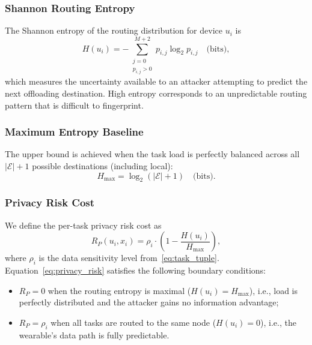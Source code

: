 \documentclass[journal,twoside,letterpaper]{IEEEtran}
\newcommand{\set}[1]{\mathcal{#1}}
\begin{document}
\subsubsection{Shannon Routing Entropy}

The Shannon entropy of the routing distribution for device $u_i$ is
\begin{equation}
  H(u_i) = -\sum_{\substack{j=0 \\ p_{i,j} > 0}}^{M+2}
              p_{i,j} \log_2 p_{i,j} \quad \text{(bits)},
  \label{eq:shannon_entropy}
\end{equation}
which measures the uncertainty available to an attacker attempting to predict
the next offloading destination.  High entropy corresponds to an unpredictable
routing pattern that is difficult to fingerprint.

\subsubsection{Maximum Entropy Baseline}

The upper bound is achieved when the task load is perfectly balanced across
all $|\set{E}|+1$ possible destinations (including local):
\begin{equation}
  H_{\max} = \log_2\!\left(|\set{E}| + 1\right) \quad \text{(bits)}.
  \label{eq:entropy_max}
\end{equation}

\subsubsection{Privacy Risk Cost}

We define the per-task privacy risk cost as
\begin{equation}
  R_P(u_i, x_i) = \rho_i \cdot \left(1 - \frac{H(u_i)}{H_{\max}}\right),
  \label{eq:privacy_risk}
\end{equation}
where $\rho_i$ is the data sensitivity level from~\eqref{eq:task_tuple}.
Equation~\eqref{eq:privacy_risk} satisfies the following boundary conditions:
\begin{itemize}
  \item $R_P = 0$ when the routing entropy is maximal ($H(u_i) = H_{\max}$),
        i.e., load is perfectly distributed and the attacker gains no
        information advantage;
  \item $R_P = \rho_i$ when all tasks are routed to the same node
        ($H(u_i) = 0$), i.e., the wearable's data path is fully predictable.
\end{itemize}
\end{document}
